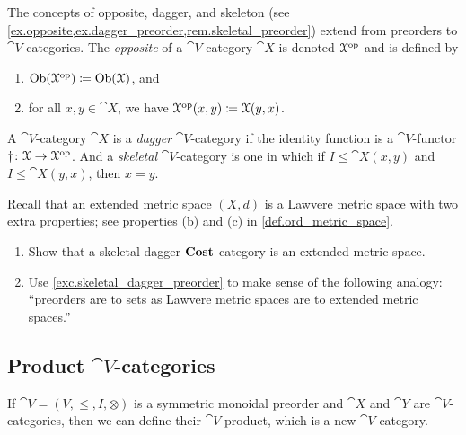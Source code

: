 \documentclass[7Sketches]{subfiles}
\begin{document}
\begin{exercise}%
\label{def.enriched_op}%
The concepts of opposite, dagger, and skeleton (see \cref{ex.opposite,ex.dagger_preorder,rem.skeletal_preorder}) extend from preorders to
$\cat{V}$-categories. The \emph{opposite} of a $\cat{V}$-category $\cat{X}$ is denoted $\mathcal{X}^{\textnormal{op}}$
and is defined by
\begin{enumerate}[label=(\roman*)]
	\item $\operatorname{Ob}(\mathcal{X}^{\textnormal{op}})\coloneqq\operatorname{Ob}(\mathcal{X})$, and
	\item for all $x,y\in \cat{X}$, we have $\mathcal{X}^{\textnormal{op}}(x,y)\coloneqq\mathcal{X}(y,x)$.
\end{enumerate}
A $\cat{V}$-category $\cat{X}$ is a \emph{dagger}%
$\cat{V}$-category if the identity function is a $\cat{V}$-functor
$\dagger\colon\mathcal{X}\to\mathcal{X}^{\textnormal{op}}$.  And a  \emph{skeletal}%
$\cat{V}$-category is one in which if $I \le \cat{X}(x,y)$ and $I \le
\cat{X}(y,x)$, then $x=y$.

Recall that an extended metric space $(X,d)$ is a Lawvere metric space with two
extra properties; see properties (b) and (c) in \cref{def.ord_metric_space}.
\begin{enumerate}
	\item Show that a skeletal dagger $\mathbf{Cost}$-category is an extended metric space.
	\item Use \cref{exc.skeletal_dagger_preorder} to make sense of the following analogy: ``preorders are to sets as
	Lawvere metric spaces are to extended metric spaces.''
	\qedhere
\end{enumerate}
%
\end{exercise}

\subsection{Product $\cat{V}$-categories}%
\label{subsec.enriched_products}
If $\cat{V}=(V,\leq,I,\otimes)$ is a symmetric monoidal preorder and $\cat{X}$ and $\cat{Y}$ are $\cat{V}$-categories, then we can define their $\cat{V}$-product, which is a new $\cat{V}$-category.
\end{document}
